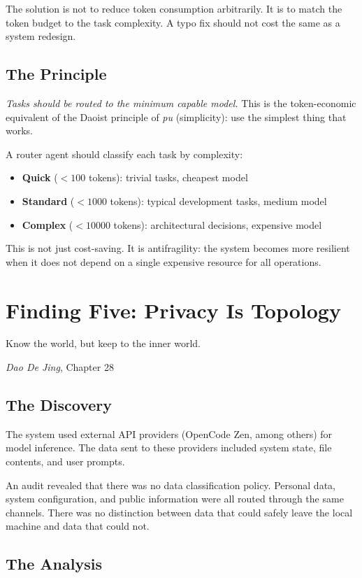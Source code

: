 \documentclass[12pt,a4paper,oneside]{book}
\begin{document}
The solution is not to reduce token consumption arbitrarily. It is to match the token budget to the task complexity. A typo fix should not cost the same as a system redesign.

\section{The Principle}

\emph{Tasks should be routed to the minimum capable model.} This is the token-economic equivalent of the Daoist principle of \emph{pu} (simplicity): use the simplest thing that works.

A router agent should classify each task by complexity:
\begin{itemize}
  \item \textbf{Quick} ($<100$ tokens): trivial tasks, cheapest model
  \item \textbf{Standard} ($<1000$ tokens): typical development tasks, medium model
  \item \textbf{Complex} ($<10000$ tokens): architectural decisions, expensive model
\end{itemize}

This is not just cost-saving. It is antifragility: the system becomes more resilient when it does not depend on a single expensive resource for all operations.

\chapter{Finding Five: Privacy Is Topology}

\epigraph{Know the world, but keep to the inner world.}{\textit{Dao De Jing}, Chapter 28}

\section{The Discovery}

The system used external API providers (OpenCode Zen, among others) for model inference. The data sent to these providers included system state, file contents, and user prompts.

An audit revealed that there was no data classification policy. Personal data, system configuration, and public information were all routed through the same channels. There was no distinction between data that could safely leave the local machine and data that could not.

\section{The Analysis}
\end{document}

